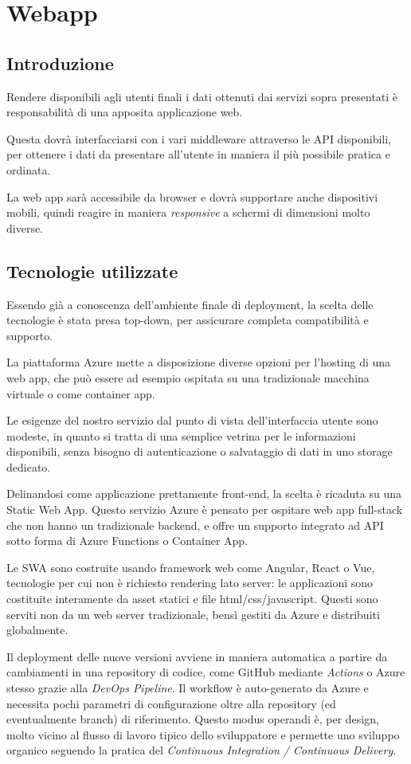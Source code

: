\section{Webapp}
\subsection{Introduzione}
Rendere disponibili agli utenti finali i dati ottenuti dai servizi sopra presentati è responsabilità di una apposita applicazione web. 

Questa dovrà interfacciarsi con i vari middleware attraverso le API disponibili, per ottenere i dati da presentare all'utente in maniera il più possibile pratica e ordinata.

La web app sarà accessibile da browser e dovrà supportare anche dispositivi mobili, quindi reagire in maniera \textit{responsive} a schermi di dimensioni molto diverse. 


\subsection{Tecnologie utilizzate}
Essendo già a conoscenza dell'ambiente finale di deployment, la scelta delle tecnologie è stata presa top-down, per assicurare completa compatibilità e supporto.

La piattaforma Azure mette a disposizione diverse opzioni per l'hosting di una web app, che può essere ad esempio ospitata su una tradizionale macchina virtuale o come container app.

Le esigenze del nostro servizio dal punto di vista dell'interfaccia utente sono modeste, in quanto si tratta di una semplice vetrina per le informazioni disponibili, senza bisogno di autenticazione o salvataggio di dati in uno storage dedicato.

Delinandosi come applicazione prettamente front-end, la scelta è ricaduta su una Static Web App. Questo servizio Azure è pensato per ospitare web app full-stack che non hanno un tradizionale backend, e offre un supporto integrato ad API sotto forma di Azure Functions o Container App.

Le SWA sono costruite usando framework web come Angular, React o Vue, tecnologie per cui non è richiesto rendering lato server: le applicazioni sono costituite interamente da asset statici e file html/css/javascript. Questi sono serviti non da un web server tradizionale, bensì gestiti da Azure e distribuiti globalmente.

Il deployment delle nuove versioni avviene in maniera automatica a partire da cambiamenti in una repository di codice, come GitHub mediante \textit{Actions} o Azure stesso grazie alla \textit{DevOps Pipeline}. 
Il workflow è auto-generato da Azure e necessita pochi parametri di configurazione oltre alla repository (ed eventualmente branch) di riferimento. Questo modus operandi è, per design, molto vicino al flusso di lavoro tipico dello sviluppatore e permette uno sviluppo organico seguendo la pratica del \textit{Continuous Integration / Continuous Delivery}.

